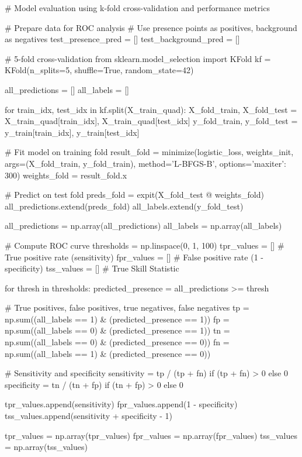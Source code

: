 \documentclass[11pt,a4paper]{article}
\begin{document}
\begin{pycode}
# Model evaluation using k-fold cross-validation and performance metrics

# Prepare data for ROC analysis
# Use presence points as positives, background as negatives
test_presence_pred = []
test_background_pred = []

# 5-fold cross-validation
from sklearn.model_selection import KFold
kf = KFold(n_splits=5, shuffle=True, random_state=42)

all_predictions = []
all_labels = []

for train_idx, test_idx in kf.split(X_train_quad):
    X_fold_train, X_fold_test = X_train_quad[train_idx], X_train_quad[test_idx]
    y_fold_train, y_fold_test = y_train[train_idx], y_train[test_idx]

    # Fit model on training fold
    result_fold = minimize(logistic_loss, weights_init,
                          args=(X_fold_train, y_fold_train),
                          method='L-BFGS-B', options={'maxiter': 300})
    weights_fold = result_fold.x

    # Predict on test fold
    preds_fold = expit(X_fold_test @ weights_fold)
    all_predictions.extend(preds_fold)
    all_labels.extend(y_fold_test)

all_predictions = np.array(all_predictions)
all_labels = np.array(all_labels)

# Compute ROC curve
thresholds = np.linspace(0, 1, 100)
tpr_values = []  # True positive rate (sensitivity)
fpr_values = []  # False positive rate (1 - specificity)
tss_values = []  # True Skill Statistic

for thresh in thresholds:
    predicted_presence = all_predictions >= thresh

    # True positives, false positives, true negatives, false negatives
    tp = np.sum((all_labels == 1) & (predicted_presence == 1))
    fp = np.sum((all_labels == 0) & (predicted_presence == 1))
    tn = np.sum((all_labels == 0) & (predicted_presence == 0))
    fn = np.sum((all_labels == 1) & (predicted_presence == 0))

    # Sensitivity and specificity
    sensitivity = tp / (tp + fn) if (tp + fn) > 0 else 0
    specificity = tn / (tn + fp) if (tn + fp) > 0 else 0

    tpr_values.append(sensitivity)
    fpr_values.append(1 - specificity)
    tss_values.append(sensitivity + specificity - 1)

tpr_values = np.array(tpr_values)
fpr_values = np.array(fpr_values)
tss_values = np.array(tss_values)


\end{pycode}
\end{document}
